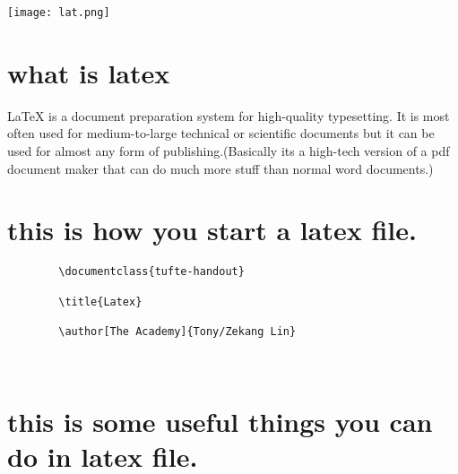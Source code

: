 	\begin{marginfigure}%
		\texttt{[image: lat.png]}
		\caption{This is the logo of latex.}
		\label{fig:marginfig}
	\end{marginfigure}
	
	
	\normalsize
	
	\vspace{1cm}
	\section{what is latex}
	
	LaTeX is a document preparation system for high-quality typesetting. It is most often used for medium-to-large technical or scientific documents but it can be used for almost any form of publishing.(Basically its a high-tech version of a pdf document maker that can do much more stuff than normal word documents.)

	

	
	\vspace{1cm}
	
	\section{this is how you start a latex file.}
	

	\begin{framed}
		\begin{verbatim}
		\documentclass{tufte-handout}
		
		\title{Latex}
		
		\author[The Academy]{Tony/Zekang Lin}
		
		
		\end{verbatim}
	\end{framed}
		\section{this is some useful things you can do in latex file.}
		
		
